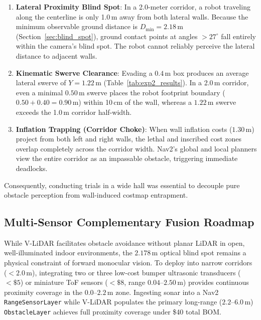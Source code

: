 \documentclass{ieeeaccess}
\begin{document}
\begin{enumerate}
  \item \textbf{Lateral Proximity Blind Spot}: In a 2.0-meter corridor, a robot traveling along the centerline is only 1.0\,m away from both lateral walls. Because the minimum observable ground distance is $D_{\min} = 2.18$\,m (Section~\ref{sec:blind_spot}), ground contact points at angles $> 27^\circ$ fall entirely within the camera's blind spot. The robot cannot reliably perceive the lateral distance to adjacent walls.
  \item \textbf{Kinematic Swerve Clearance}: Evading a $0.4$\,m box produces an average lateral swerve of $Y = 1.22$\,m (Table~\ref{tab:exp2_results}). In a 2.0\,m corridor, even a minimal $0.50$\,m swerve places the robot footprint boundary ($0.50 + 0.40 = 0.90$\,m) within 10\,cm of the wall, whereas a $1.22$\,m swerve exceeds the 1.0\,m corridor half-width.
  \item \textbf{Inflation Trapping (Corridor Choke)}: When wall inflation costs ($1.30$\,m) project from both left and right walls, the lethal and inscribed cost zones overlap completely across the corridor width. Nav2's global and local planners view the entire corridor as an impassable obstacle, triggering immediate deadlocks.
\end{enumerate}
Consequently, conducting trials in a wide hall was essential to decouple pure obstacle perception from wall-induced costmap entrapment.

\subsection{Multi-Sensor Complementary Fusion Roadmap}
\label{subsec:sensor_fusion_roadmap}
While V-LiDAR facilitates obstacle avoidance without planar LiDAR in open, well-illuminated indoor environments, the $2.178$\,m optical blind spot remains a physical constraint of forward monocular vision. To deploy into narrow corridors ($<2.0$\,m), integrating two or three low-cost bumper ultrasonic transducers ($<\$5$) or miniature ToF sensors ($<\$8$, range $0.04\text{--}2.50$\,m) provides continuous proximity coverage in the $0.0\text{--}2.2$\,m zone. Ingesting sonar into a Nav2 \texttt{RangeSensorLayer} while V-LiDAR populates the primary long-range ($2.2\text{--}6.0$\,m) \texttt{ObstacleLayer} achieves full proximity coverage under \$40 total BOM.
\end{document}
